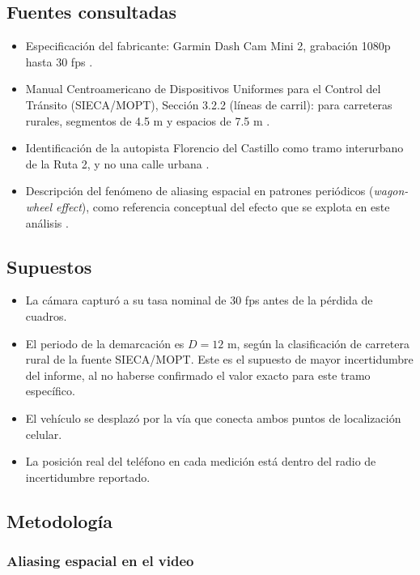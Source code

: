 \documentclass[conference]{IEEEtran}
\begin{document}
\subsection{Fuentes consultadas}

\begin{itemize}
\item Especificación del fabricante: Garmin Dash Cam Mini 2, grabación 1080p hasta 30 fps \cite{garmin2024}.
\item Manual Centroamericano de Dispositivos Uniformes para el Control del Tránsito (SIECA/MOPT), Sección 3.2.2 (líneas de carril): para carreteras rurales, segmentos de 4.5 m y espacios de 7.5 m \cite{sieca2014}.
\item Identificación de la autopista Florencio del Castillo como tramo interurbano de la Ruta 2, y no una calle urbana \cite{ruta2wiki}.
\item Descripción del fenómeno de aliasing espacial en patrones periódicos (\textit{wagon-wheel effect}), como referencia conceptual del efecto que se explota en este análisis \cite{wagonwheel}.
\end{itemize}

\subsection{Supuestos}

\begin{itemize}
\item La cámara capturó a su tasa nominal de 30 fps antes de la pérdida de cuadros.
\item El periodo de la demarcación es $D=12$ m, según la clasificación de carretera rural de la fuente SIECA/MOPT. 
Este es el supuesto de mayor incertidumbre del informe, al no haberse confirmado el valor exacto para este tramo específico.
\item El vehículo se desplazó por la vía que conecta ambos puntos de localización celular.
\item La posición real del teléfono en cada medición está dentro del radio de incertidumbre reportado.
\end{itemize}

\subsection{Metodología}

\subsubsection{Aliasing espacial en el video}
\end{document}
